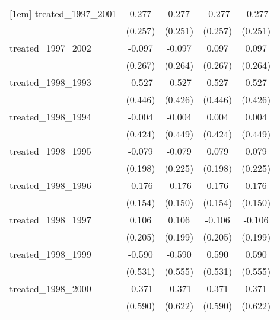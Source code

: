 {\begin{tabular}{l*{4}{c}}
[1em]
treated\_1997\_2001&       0.277         &       0.277         &      -0.277         &      -0.277         \\
            &     (0.257)         &     (0.251)         &     (0.257)         &     (0.251)         \\
[1em]
treated\_1997\_2002&      -0.097         &      -0.097         &       0.097         &       0.097         \\
            &     (0.267)         &     (0.264)         &     (0.267)         &     (0.264)         \\
[1em]
treated\_1998\_1993&      -0.527         &      -0.527         &       0.527         &       0.527         \\
            &     (0.446)         &     (0.426)         &     (0.446)         &     (0.426)         \\
[1em]
treated\_1998\_1994&      -0.004         &      -0.004         &       0.004         &       0.004         \\
            &     (0.424)         &     (0.449)         &     (0.424)         &     (0.449)         \\
[1em]
treated\_1998\_1995&      -0.079         &      -0.079         &       0.079         &       0.079         \\
            &     (0.198)         &     (0.225)         &     (0.198)         &     (0.225)         \\
[1em]
treated\_1998\_1996&      -0.176         &      -0.176         &       0.176         &       0.176         \\
            &     (0.154)         &     (0.150)         &     (0.154)         &     (0.150)         \\
[1em]
treated\_1998\_1997&       0.106         &       0.106         &      -0.106         &      -0.106         \\
            &     (0.205)         &     (0.199)         &     (0.205)         &     (0.199)         \\
[1em]
treated\_1998\_1999&      -0.590         &      -0.590         &       0.590         &       0.590         \\
            &     (0.531)         &     (0.555)         &     (0.531)         &     (0.555)         \\
[1em]
treated\_1998\_2000&      -0.371         &      -0.371         &       0.371         &       0.371         \\
            &     (0.590)         &     (0.622)         &     (0.590)         &     (0.622)         \\

\end{tabular}}
